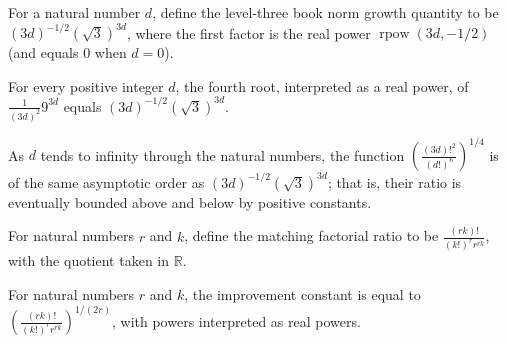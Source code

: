 \begin{definition}
\label{FABL.levelThreeBookNormGrowth}
\leanok
For a natural number $d$, define the level-three book norm growth quantity to be
$\displaystyle(3d)^{-1/2}(\sqrt{3})^{3d}$, where the first factor is the real power
$\operatorname{rpow}(3d,-1/2)$ (and equals $0$ when $d=0$).
\end{definition}

\begin{theorem}
\label{FABL.levelThreeBookGrowth_fourthRoot_eq_normGrowth}
\leanok
{}
For every positive integer $d$, the fourth root, interpreted as a real power, of
$\frac{1}{(3d)^2}9^{3d}$ equals $(3d)^{-1/2}(\sqrt{3})^{3d}$.
\end{theorem}

\begin{theorem}
\label{FABL.levelThreeFactorialConstant_fourthRoot_isTheta_normGrowth}
\leanok
{}
As $d$ tends to infinity through the natural numbers, the function
$\left(\frac{(3d)!^2}{(d!)^6}\right)^{1/4}$ is of the same asymptotic order as
$(3d)^{-1/2}(\sqrt{3})^{3d}$; that is, their ratio is eventually bounded above and below
by positive constants.
\end{theorem}

\begin{definition}
\label{FABL.matchingFactorialRatio}
\leanok
For natural numbers $r$ and $k$, define the matching factorial ratio to be
$\displaystyle\frac{(rk)!}{(k!)^r r^{rk}}$, with the quotient taken in $\mathbb{R}$.
\end{definition}

\begin{theorem}
\label{FABL.matchingImprovementConstant_eq_rpow_factorialRatio}
\leanok
{}
For natural numbers $r$ and $k$, the improvement constant is equal to
$\left(\frac{(rk)!}{(k!)^r r^{rk}}\right)^{1/(2r)}$, with powers interpreted as real
powers.
\end{theorem}

